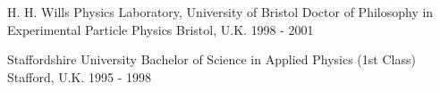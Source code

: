 

\begin{cventries}

    \award
    {H. H. Wills Physics Laboratory, University of Bristol} %
    {Doctor of Philosophy in Experimental Particle Physics} %
    {Bristol, U.K.} %
    {1998 - 2001} %
    {}

    \award
    {Staffordshire University} %
    {Bachelor of Science in Applied Physics (1st Class)} %
    {Stafford, U.K.} %
    {1995 - 1998} %
    {}


\end{cventries}